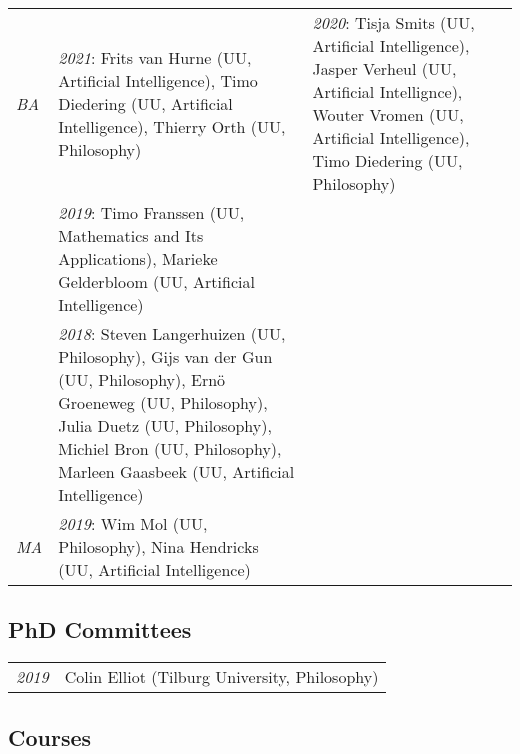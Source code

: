 \begin{tabular}{p{.1\linewidth} p{.8\linewidth}}
  \emph{BA}  & \emph{2021}: Frits van Hurne (UU, Artificial Intelligence),
                            Timo Diedering (UU, Artificial Intelligence),
                            Thierry Orth (UU, Philosophy)

             & \emph{2020}: Tisja Smits (UU, Artificial Intelligence),
                            Jasper Verheul (UU, Artificial Intellignce),
                            Wouter Vromen (UU, Artificial Intelligence),
                            Timo Diedering (UU, Philosophy)\\
             & \emph{2019}: Timo Franssen (UU, Mathematics and Its
                            Applications), Marieke Gelderbloom (UU, Artificial Intelligence)\\
             & \emph{2018}: Steven Langerhuizen (UU, Philosophy), Gijs van der
                            Gun (UU, Philosophy), Ern\"o Groeneweg (UU, Philosophy), Julia Duetz (UU,
                            Philosophy), Michiel Bron (UU, Philosophy), Marleen Gaasbeek (UU, Artificial
                            Intelligence)\\[1ex]
  \emph{MA}  & \emph{2019}: Wim Mol (UU, Philosophy),
                            Nina Hendricks (UU, Artificial Intelligence)\\
\end{tabular}

\subsection*{PhD Committees}

\begin{tabular}{p{.1\linewidth} p{.8\linewidth}}
  \emph{2019} & Colin Elliot (Tilburg University, Philosophy)\\
\end{tabular}

\subsection*{Courses}

